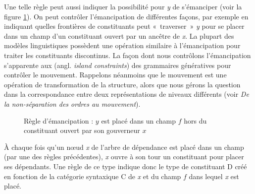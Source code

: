     Une telle règle peut aussi indiquer la possibilité pour \textit{y} de s’émanciper (voir la figure \ref{fig:regle-emancipation}). On peut contrôler l’émancipation de différentes façons, par exemple en indiquant quelles frontières de constituants peut «~traverser~» \textit{y} pour se placer dans un champ d’un constituant ouvert par un ancêtre de \textit{x}. La plupart des modèles linguistiques possèdent une opération similaire à l’émancipation pour traiter les constituants discontinus. La façon dont nous contrôlons l’émancipation s’apparente aux  (angl. \textit{island constraints}) des grammaires génératives pour contrôler le mouvement. Rappelons néanmoins que le mouvement est une opération de transformation de la structure, alors que nous gérons la question dans la correspondance entre deux représentations de niveaux différents (voir   \textit{De la non-séparation des ordres au mouvement}).
  
    
    \begin{figure}[H]
    \caption{Règle d'émancipation : $y$ est placé dans un champ $f$ hors du constituant ouvert par son gouverneur $x$}
    \label{fig:regle-emancipation}
    \end{figure}

   À chaque fois qu’un nœud \textit{x} de l’arbre de dépendance est placé dans un champ (par une des règles précédentes), \textit{x} ouvre à son tour un constituant pour placer ses dépendants. Une règle de ce type indique donc le type de constituant D créé en fonction de la catégorie syntaxique C de \textit{x} et du champ $f$ dans lequel \textit{x} est placé.
   
